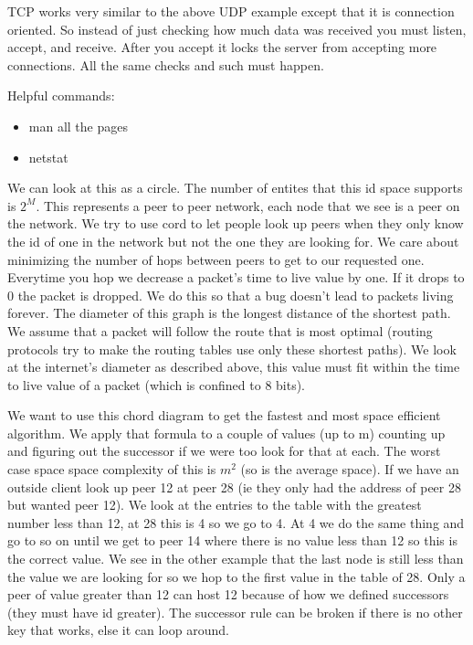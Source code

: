 \documentclass[12pt]{article}
\begin{document}
TCP works very similar to the above UDP example except that it is connection oriented. So instead of just checking how much data was received you must listen, accept, and receive. After you accept it locks the server from accepting more connections. All the same checks and such must happen.  

Helpful commands:
\begin{itemize}
	\item man all the pages
	\item netstat
\end{itemize}




We can look at this as a circle. The number of entites that this id space supports is $2^M$. This represents a peer to peer network, each node that we see is a peer on the network. We try to use cord to let people look up peers when they only know the id of one in the network but not the one they are looking for. We care about minimizing the number of hops between peers to get to our requested one. Everytime you hop we decrease a packet's time to live value by one. If it drops to 0 the packet is dropped. We do this so that a bug doesn't lead to packets living forever. The diameter of this graph is the longest distance of the shortest path. We assume that a packet will follow the route that is most optimal (routing protocols try to make the routing tables use only these shortest paths). We look at the internet's diameter as described above, this value must fit within the time to live value of a packet (which is confined to 8 bits). 


We want to use this chord diagram to get the fastest and most space efficient algorithm. We apply that formula to a couple of values (up to m) counting up and figuring out the successor if we were too look for that at each. The worst case space space complexity of this is $m^2$ (so is the average space). If we have an outside client look up peer 12 at peer 28 (ie they only had the address of peer 28 but wanted peer 12). We look at the entries to the table with the greatest number less than 12, at 28 this is 4 so we go to 4. At 4 we do the same thing and go to so on until we get to peer 14 where there is no value less than 12 so this is the correct value. We see in the other example that the last node is still less than the value we are looking for so we hop to the first value in the table of 28. Only a peer of value greater than 12 can host 12 because of how we defined successors (they must have id greater). The successor rule can be broken if there is no other key that works, else it can loop around.
\end{document}
